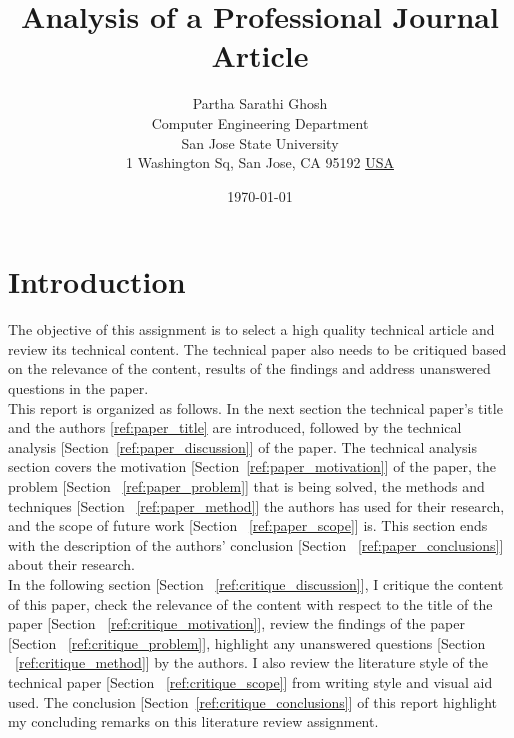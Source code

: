 \documentclass[12pt]{article}
\title{Analysis of a Professional Journal Article}
\author{
        Partha Sarathi Ghosh\\
        Computer Engineering Department\\
        San Jose State University\\
        1 Washington Sq, San Jose, CA 95192 \underline{USA}
}
\date{\today}
\begin{document}
\maketitle
{}
\pagebreak


\begin{center}
\tableofcontents
\end{center}
\pagebreak
\begin{center}
\listoffigures
\end{center}
\pagebreak


\section{Introduction}
\indent The objective of this assignment is to select a high quality technical article and review its technical content. The technical paper also needs to be critiqued based on the relevance of the content, results of the findings and address unanswered questions in the paper. \\
This report is organized as follows. In the next section the technical paper's title and the authors \ref{ref:paper_title} are introduced, followed by the technical analysis [Section~\ref{ref:paper_discussion}] of the paper. The technical analysis section covers the motivation [Section~\ref{ref:paper_motivation}] of the paper, the problem [Section ~\ref{ref:paper_problem}] that is being solved, the methods and techniques [Section ~\ref{ref:paper_method}] the authors has used for their research, and the scope of future work [Section ~\ref{ref:paper_scope}] is. This section ends with the description of the authors' conclusion [Section ~\ref{ref:paper_conclusions}] about their research. \\
In the following section [Section ~\ref{ref:critique_discussion}], I critique the content of this paper, check the relevance of the content with respect to the title of the paper [Section ~\ref{ref:critique_motivation}], review the findings of the paper [Section ~\ref{ref:critique_problem}], highlight any unanswered questions [Section ~\ref{ref:critique_method}] by the authors. I also review the literature style of the technical paper [Section ~\ref{ref:critique_scope}] from writing style and visual aid used. The conclusion [Section~\ref{ref:critique_conclusions}] of this report highlight my concluding remarks on this literature review assignment.
\end{document}
